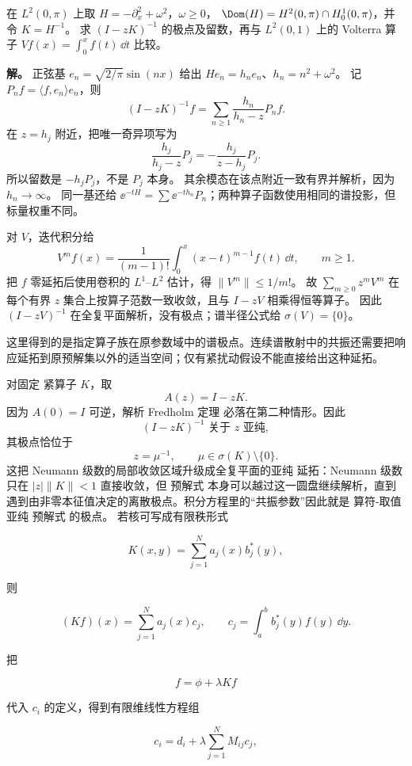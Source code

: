 \begin{exbox}
在 $L^2(0,\pi)$ 上取 $H=-\partial_x^2+\omega^2$，$\omega\ge0$，
$\Dom(H)=H^2(0,\pi)\cap H_0^1(0,\pi)$，并令 $K=H^{-1}$。
求 $(I-zK)^{-1}$ 的极点及留数，再与 $L^2(0,1)$ 上的 Volterra 算子 $Vf(x)=\int_0^xf(t)\,\dd t$ 比较。

\textbf{解。} 正弦基 $e_n=\sqrt{2/\pi}\sin(nx)$ 给出 $He_n=h_ne_n$、$h_n=n^2+\omega^2$。
记 $P_n f=\langle f,e_n\rangle e_n$，则
\[
(I-zK)^{-1}f=\sum_{n\ge1}\frac{h_n}{h_n-z}P_nf.
\]
在 $z=h_j$ 附近，把唯一奇异项写为
\[
\frac{h_j}{h_j-z}P_j=-\frac{h_j}{z-h_j}P_j.
\]
所以留数是 $-h_jP_j$，不是 $P_j$ 本身。
其余模态在该点附近一致有界并解析，因为 $h_n\to\infty$。
同一基还给 $\ee^{-tH}=\sum \ee^{-th_n}P_n$；两种算子函数使用相同的谱投影，但标量权重不同。

对 $V$，迭代积分给
\[
V^mf(x)=\frac1{(m-1)!}\int_0^x(x-t)^{m-1}f(t)\,\dd t,
\qquad m\ge1.
\]
把 $f$ 零延拓后使用卷积的 $L^1$–$L^2$ 估计，得 $\|V^m\|\le1/m!$。
故 $\sum_{m\ge0}z^mV^m$ 在每个有界 $z$ 集合上按算子范数一致收敛，且与 $I-zV$ 相乘得恒等算子。
因此 $(I-zV)^{-1}$ 在全复平面解析，没有极点；谱半径公式给 $\sigma(V)=\{0\}$。
\end{exbox}

这里得到的是指定算子族在原参数域中的谱极点。连续谱散射中的共振还需要把响应延拓到原预解集以外的适当空间；仅有紧扰动假设不能直接给出这种延拓。

对固定 紧算子 $K$，取
\[
A(z)=I-zK.
\]
因为 $A(0)=I$ 可逆，解析 Fredholm 定理 必落在第二种情形。因此
\begin{equation*}{
(I-zK)^{-1}
\text{ 关于 }z\text{ 亚纯},
}\end{equation*}
其极点恰位于
\[
z=\mu^{-1},
\qquad
\mu\in\sigma(K)\setminus\{0\}.
\]
这把 Neumann 级数的局部收敛区域升级成全复平面的亚纯 延拓：Neumann 级数只在 $|z|\|K\|<1$ 直接收敛，但 预解式 本身可以越过这一圆盘继续解析，直到遇到由非零本征值决定的离散极点。积分方程里的“共振参数”因此就是 算符-取值 亚纯 预解式 的极点。
若核可写成有限秩形式

\[
K(x,y)=\sum_{j=1}^N a_j(x)b_j^*(y),
\]

则

\[
(Kf)(x)=\sum_{j=1}^N a_j(x)c_j,
\qquad
c_j=\int_a^b b_j^*(y)f(y)\,\dd y.
\]

把

\[
f=\phi+\lambda Kf
\]

代入 $c_i$ 的定义，得到有限维线性方程组

\[
c_i=d_i+\lambda\sum_{j=1}^N M_{ij}c_j,
\]

